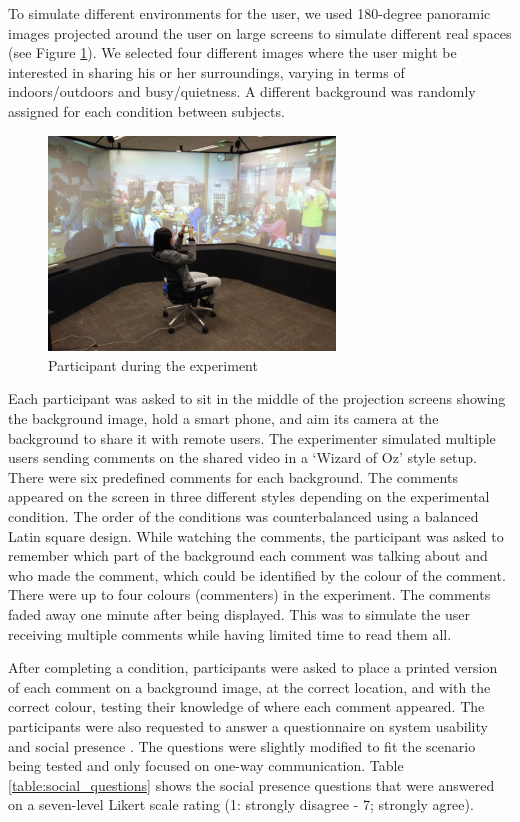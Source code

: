 To simulate different environments for the user, we used 180-degree panoramic images projected around the user on large screens to simulate different real spaces (see Figure \ref{fig:mgia16:participant}). We selected four different images where the user might be interested in sharing his or her surroundings, varying in terms of indoors/outdoors and busy/quietness. A different background was randomly assigned for each condition between subjects. 

\begin{figure}[ht]
  \centering
  \includegraphics[width=3in]{images/mgia16/participant1}
  \caption{Participant during the experiment}
	\label{fig:mgia16:participant}
\end{figure}

Each participant was asked to sit in the middle of the projection screens showing the background image, hold a smart phone, and aim its camera at the background to share it with remote users. The experimenter simulated multiple users sending comments on the shared video in a ‘Wizard of Oz' style setup. There were six predefined comments for each background. The comments appeared on the screen in three different styles depending on the experimental condition. The order of the conditions was counterbalanced using a balanced Latin square design. While watching the comments, the participant was asked to remember which part of the background each comment was talking about and who made the comment, which could be identified by the colour of the comment. There were up to four colours (commenters) in the experiment. The comments faded away one minute after being displayed. This was to simulate the user receiving multiple comments while having limited time to read them all.


After completing a condition, participants were asked to place a printed version of each comment on a background image, at the correct location, and with the correct colour, testing their knowledge of where each comment appeared. The participants were also requested to answer a questionnaire on system usability \cite{brooke1996sus} and social presence \cite{Harms2004}. The questions were slightly modified to fit the scenario being tested and only focused on one-way communication. Table \ref{table:social_questions} shows the social presence questions that were answered on a seven-level Likert scale rating (1: strongly disagree - 7; strongly agree). 

